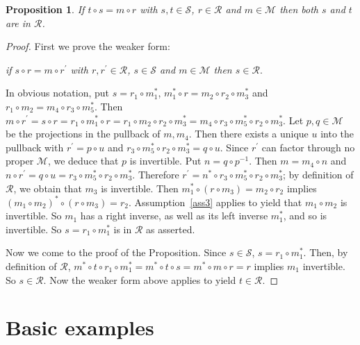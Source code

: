 \documentclass[a4paper,12pt,reqno]{amsart}
\newtheorem{proposition}[theorem]{Proposition}
\theoremstyle{definition}
\theoremstyle{fact}
\theoremstyle{genquest}
\theoremstyle{step}
\def\CM{{\mathscr M}}
\def\CR{{\mathscr R}}
\def\CS{{\mathscr S}}
\begin{document}
\begin{proposition}\label{oldeff}
If $t\circ s = m\circ r$ with $s,t\in \CS$, $r\in \CR$ and $m\in \CM$ then both $s$ and
$t$ are in $\CR$. 
\end{proposition}
\begin{proof}
First we prove the weaker form: 

{\em if $s\circ r = m\circ r^{\prime}$ with $r,r^{\prime} \in \CR$, $s\in \CS$ and $m\in \CM$ then $s\in \CR$}.

\noindent In obvious notation, put $s=r_1\circ m_1^*$, $m_1^*\circ r = m_2\circ r_2\circ m_3^*$
and $r_1\circ m_2=m_4\circ r_3\circ m_5^*$.
Then $m\circ r^{\prime} = s\circ r = r_1\circ m_1^*\circ r = r_1\circ m_2\circ r_2 \circ m_3^* = m_4\circ r_3\circ m_5^*\circ r_2 \circ m_3^*$. 
Let $p,q\in \CM$ be the projections in the pullback of $m,m_4$. 
Then there exists a unique $u$ into the pullback with $r^{\prime} = p\circ u$
and $r_3\circ m_5^*\circ r_2 \circ m_3^* = q\circ u$. 
Since $r^{\prime}$ can factor through no proper $\CM$, we deduce that $p$ is invertible.
Put $n = q\circ p^{-1}$.
Then $m=m_4\circ n$ and $n\circ r^{\prime} = q\circ u = r_3\circ m_5^*\circ r_2 \circ m_3^*$. Therefore $r^{\prime} = n^* \circ r_3\circ m_5^*\circ r_2 \circ m_3^*$;
by definition of $\CR$, we obtain that $m_3$ is invertible. 
Then $m_1^*\circ (r\circ m_3) = m_2 \circ r_2$ implies 
$(m_1\circ m_2)^*\circ (r\circ m_3) = r_2$. Assumption~\ref{ass3} applies to yield that
$m_1\circ m_2$ is invertible. So $m_1$ has a right inverse, as well as its left inverse
$m_1^*$, and so is invertible. So $s=r_1\circ m_1^*$ is in $\CR$ as asserted.  

Now we come to the proof of the Proposition. Since $s\in \CS$, $s= r_1\circ m_1^*$. 
Then, by definition of $\CR$, $m^*\circ t \circ r_1\circ m_1^* 
= m^*\circ t \circ s= m^*\circ m\circ r = r$ implies $m_1$
invertible. So $s\in \CR$. Now the weaker form above applies to yield $t\in \CR$.  
\end{proof}

\section{Basic examples}\label{basex}
\end{document}
